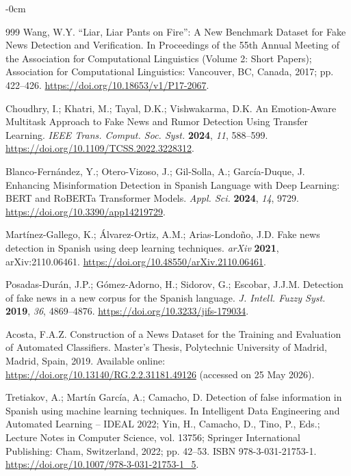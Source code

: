\documentclass[informatics,article,submit,pdftex,moreauthors]{Definitions/mdpi}
\begin{document}
\begin{adjustwidth}{-\extralength}{0cm}
\begin{thebibliography}{999}
Wang, W.Y. ``Liar, Liar Pants on Fire'': A New Benchmark Dataset for Fake News Detection and Verification. In Proceedings of the 55th Annual Meeting of the Association for Computational Linguistics (Volume 2: Short Papers); Association for Computational Linguistics: Vancouver, BC, Canada, 2017; pp. 422--426. \href{https://doi.org/10.18653/v1/P17-2067}{https://doi.org/10.18653/v1/P17-2067}.
 
Choudhry, I.; Khatri, M.; Tayal, D.K.; Vishwakarma, D.K. An Emotion-Aware Multitask Approach to Fake News and Rumor Detection Using Transfer Learning. \textit{IEEE Trans. Comput. Soc. Syst.} \textbf{2024}, \textit{11}, 588--599. \href{https://doi.org/10.1109/TCSS.2022.3228312}{https://doi.org/10.1109/TCSS.2022.3228312}.
 
Blanco-Fernández, Y.; Otero-Vizoso, J.; Gil-Solla, A.; García-Duque, J. Enhancing Misinformation Detection in Spanish Language with Deep Learning: BERT and RoBERTa Transformer Models. \textit{Appl. Sci.} \textbf{2024}, \textit{14}, 9729. \href{https://doi.org/10.3390/app14219729}{https://doi.org/10.3390/app14219729}.
 
Martínez-Gallego, K.; Álvarez-Ortiz, A.M.; Arias-Londoño, J.D. Fake news detection in Spanish using deep learning techniques. \textit{arXiv} \textbf{2021}, arXiv:2110.06461. \href{https://doi.org/10.48550/arXiv.2110.06461}{https://doi.org/10.48550/arXiv.2110.06461}.
 
Posadas-Durán, J.P.; Gómez-Adorno, H.; Sidorov, G.; Escobar, J.J.M. Detection of fake news in a new corpus for the Spanish language. \textit{J. Intell. Fuzzy Syst.} \textbf{2019}, \textit{36}, 4869--4876. \href{https://doi.org/10.3233/jifs-179034}{https://doi.org/10.3233/jifs-179034}.
 
Acosta, F.A.Z. Construction of a News Dataset for the Training and Evaluation of Automated Classifiers. Master's Thesis, Polytechnic University of Madrid, Madrid, Spain, 2019. Available online: \href{https://doi.org/10.13140/RG.2.2.31181.49126}{https://doi.org/10.13140/RG.2.2.31181.49126} (accessed on 25 May 2026).
 
Tretiakov, A.; Martín García, A.; Camacho, D. Detection of false information in Spanish using machine learning techniques. In Intelligent Data Engineering and Automated Learning -- IDEAL 2022; Yin, H., Camacho, D., Tino, P., Eds.; Lecture Notes in Computer Science, vol. 13756; Springer International Publishing: Cham, Switzerland, 2022; pp. 42--53. ISBN 978-3-031-21753-1. \href{https://doi.org/10.1007/978-3-031-21753-1_5}{https://doi.org/10.1007/978-3-031-21753-1\_5}.
 

\end{thebibliography}
\end{adjustwidth}
\end{document}
